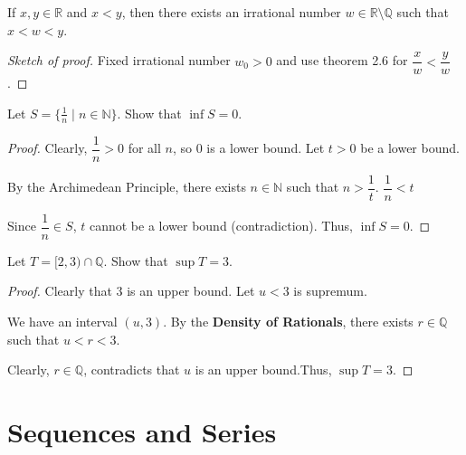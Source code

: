 \documentclass[
	UTF-8,
	11pt, %
	a4paper, %
]{LegrandOrangeBook}
\begin{document}
    \begin{remark}
        
    \end{remark}

    \begin{theorem}
    If $x, y \in \mathbb{R}$ and $x < y$, then there exists an irrational number $w \in \mathbb{R} \setminus \mathbb{Q}$ such that $x < w < y$.
    \end{theorem}

    \begin{proof}[Sketch of proof]
    Fixed irrational number $w_0 > 0$ and use theorem 2.6 for $\dfrac{x}{w}<\dfrac{y}{w}$.
    \end{proof}

    \begin{example}
    Let $S = \{ \frac{1}{n} \mid n \in \mathbb{N} \}$. Show that $\inf S = 0$.
    \begin{proof}
        
        Clearly, $\dfrac{1}{n} > 0$ for all $n$, so $0$ is a lower bound.
        Let $t > 0$ be a lower bound.

        By the Archimedean Principle, there exists $n \in \mathbb{N}$ such that $n > \dfrac{1}{t}$.
        $\dfrac{1}{n} < t$

        Since $\dfrac{1}{n} \in S$, $t$ cannot be a lower bound (contradiction).
        Thus, $\inf S = 0$.
    \end{proof}
    \end{example}

    \begin{example}
    Let $T = [2, 3) \cap \mathbb{Q}$. Show that $\sup T = 3$.

    \begin{proof}
    Clearly that $3$ is an upper bound. Let  $u < 3$ is supremum.

    We have an interval $(u, 3)$. By the \textbf{Density of Rationals}, 
    there exists $r \in \mathbb{Q}$ such that $u < r < 3$.

    Clearly, $r \in \mathbb{Q}$, contradicts that $u$ is an upper bound.Thus, $\sup T = 3$.
    \end{proof}

    \end{example}

    \newpage

    \chapter{Sequences and Series}
\end{document}
